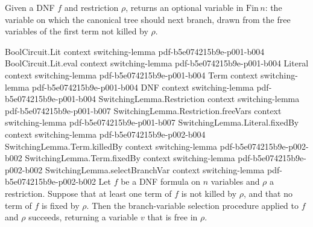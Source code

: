 \begin{definition}
\label{SwitchingLemma.selectBranchVar}
\leanok
{}
Given a DNF $f$ and restriction $\rho$, returns an optional variable in $\mathrm{Fin}\,n$:
the variable on which the canonical tree should next branch, drawn from the free variables
of the first term not killed by $\rho$.
\end{definition}

\begin{lemma}
\label{SwitchingLemma.selectBranchVar_spec}
\leanok
{}
\proofstep
  {BoolCircuit.Lit}
  {context}
  {switching-lemma}
  {pdf-b5e074215b9e-p001-b004}
\proofstep
  {BoolCircuit.Lit.eval}
  {context}
  {switching-lemma}
  {pdf-b5e074215b9e-p001-b004}
\proofstep
  {Literal}
  {context}
  {switching-lemma}
  {pdf-b5e074215b9e-p001-b004}
\proofstep
  {Term}
  {context}
  {switching-lemma}
  {pdf-b5e074215b9e-p001-b004}
\proofstep
  {DNF}
  {context}
  {switching-lemma}
  {pdf-b5e074215b9e-p001-b004}
\proofstep
  {SwitchingLemma.Restriction}
  {context}
  {switching-lemma}
  {pdf-b5e074215b9e-p001-b007}
\proofstep
  {SwitchingLemma.Restriction.freeVars}
  {context}
  {switching-lemma}
  {pdf-b5e074215b9e-p001-b007}
\proofstep
  {SwitchingLemma.Literal.fixedBy}
  {context}
  {switching-lemma}
  {pdf-b5e074215b9e-p002-b004}
\proofstep
  {SwitchingLemma.Term.killedBy}
  {context}
  {switching-lemma}
  {pdf-b5e074215b9e-p002-b002}
\proofstep
  {SwitchingLemma.Term.fixedBy}
  {context}
  {switching-lemma}
  {pdf-b5e074215b9e-p002-b002}
\proofstep
  {SwitchingLemma.selectBranchVar}
  {context}
  {switching-lemma}
  {pdf-b5e074215b9e-p002-b002}
Let $f$ be a DNF formula on $n$ variables and $\rho$ a restriction. Suppose that at
least one term of $f$ is not killed by $\rho$, and that no term of $f$ is fixed by
$\rho$. Then the branch-variable selection procedure applied to $f$ and $\rho$ succeeds,
returning a variable $v$ that is free in $\rho$.
\end{lemma}

